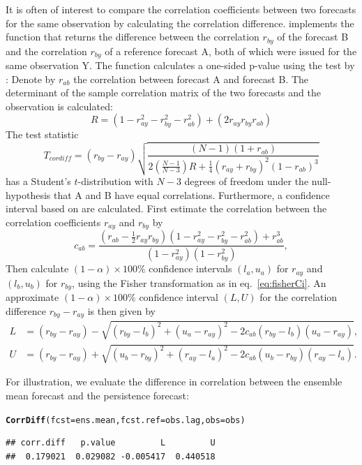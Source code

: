 \documentclass[article]{jss}\usepackage{graphicx, color}
\makeatletter
\newcommand{\hlfunctioncall}[1]{\textcolor[rgb]{0,0.501960784313725,0.752941176470588}{\textbf{#1}}}%
\newenvironment{kframe}{%
 \def\at@end@of@kframe{}%
 \ifinner\ifhmode%
  \def\at@end@of@kframe{\end{minipage}}%
  \begin{minipage}{\columnwidth}%
 \fi\fi%
 \def\FrameCommand##1{\hskip\@totalleftmargin \hskip-\fboxsep
 \colorbox{shadecolor}{##1}\hskip-\fboxsep
     \hskip-\linewidth \hskip-\@totalleftmargin \hskip\columnwidth}%
 \MakeFramed {\advance\hsize-\width
   \@totalleftmargin\z@ \linewidth\hsize
   \@setminipage}}%
 {\par\unskip\endMakeFramed%
 \at@end@of@kframe}
\newenvironment{knitrout}{}{} %
\makeatother
\begin{document}
It is often of interest to compare the correlation coefficients between two forecasts for the same observation by calculating the correlation difference.
 implements the function  that returns the difference between the correlation $r_{by}$ of the forecast B and the correlation $r_{by}$ of a reference forecast A, both of which were issued for the same observation Y.
The function calculates a one-sided p-value using the test by \citet{steiger1980tests}:
Denote by $r_{ab}$ the correlation between forecast A and forecast B.
The determinant of the sample correlation matrix of the two forecasts and the observation is calculated:
%
\begin{equation}
R  = (1 - r_{ay}^2 - r_{by}^2 - r_{ab}^2) + (2 r_{ay} r_{by} r_{ab})
\end{equation}
%
The test statistic
%
\begin{equation}
T_{cordiff}  = (r_{by} - r_{ay}) \sqrt{\frac{(N-1)(1+r_{ab})}{2\left(\frac{N-1}{N-3}\right) R+\frac{1}{4}(r_{ay}+r_{by})^2 (1-r_{ab})^3}}\label{eq:T2}
\end{equation}
%
has a Student's $t$-distribution with $N-3$ degrees of freedom under the null-hypothesis that A and B have equal correlations.
Furthermore, a confidence interval based on \citet{zou2007toward} are calculated.
First estimate the correlation between the correlation coefficients $r_{ay}$ and $r_{by}$ by
%
\begin{equation}
c_{ab} = \frac{\left(r_{ab} - \frac{1}{2}  r_{ay}  r_{by}\right)  \left(1 - r_{ay}^2 - r_{by}^2 - r_{ab}^2\right) + r_{ab}^3}{(1-r_{ay}^2)(1-r_{by}^2)},
\end{equation}
%
Then calculate $(1-\alpha)\times 100\%$ confidence intervals $(l_a, u_a)$ for $r_{ay}$ and $(l_b, u_b)$ for $r_{by}$, using the Fisher transformation as in eq.~\ref{eq:fisherCi}.
An approximate $(1-\alpha)\times 100\%$ confidence interval $(L,U)$ for the correlation difference $r_{by} - r_{ay}$ is then given by
%
\begin{align}
L & = (r_{by} - r_{ay}) - \sqrt{(r_{by} - l_b)^2 + (u_a-r_{ay})^2 - 2  c_{ab}  (r_{by} - l_b) 
(u_a - r_{ay})},\nonumber\\
U & =  (r_{by} - r_{ay}) + \sqrt{(u_{b} - r_{by})^2 + (r_{ay}-l_a)^2 - 2 c_{ab} (u_b-r_{by})(r_{ay}-l_a)}.\label{eq:zou}
\end{align}

For illustration, we evaluate the difference in correlation between the ensemble mean forecast and the persistence forecast:
%
\begin{knitrout}
\color{fgcolor}\begin{kframe}
\begin{alltt}
\hlfunctioncall{CorrDiff}(fcst=ens.mean, fcst.ref=obs.lag, obs=obs)
\end{alltt}
\begin{verbatim}
## corr.diff   p.value         L         U 
##  0.179021  0.029082 -0.005417  0.440518
\end{verbatim}
\end{kframe}
\end{knitrout}
\end{document}
